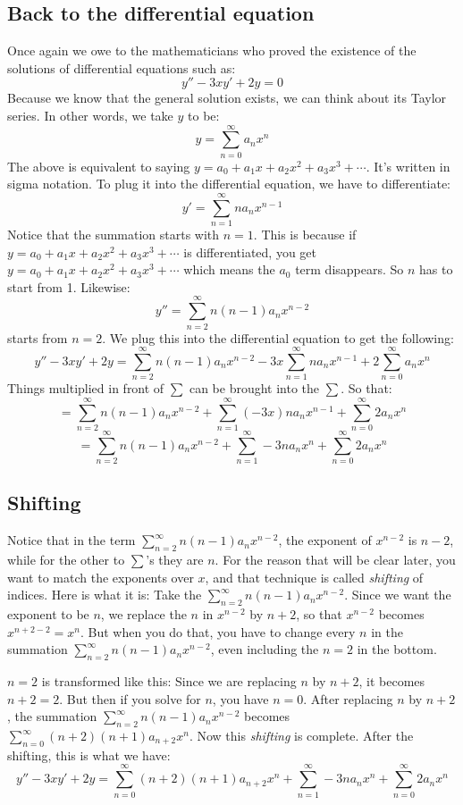 \documentclass[12pt]{report}
\begin{document}
\subsection*{Back to the differential equation}
Once again we owe to the mathematicians who proved the existence of the solutions of differential equations such as:
$$y'' - 3xy'+2y=0$$
Because we know that the general solution exists, we can think about its Taylor series. In other words, we take $y$ to be:
$$y = \sum_{n=0}^{\infty} a_n x^{n} $$
The above is equivalent to saying $y=a_0 + a_1 x + a_2 x^2 +a_3 x^3 +\cdots$. It's written in sigma notation.
To plug it into the differential equation, we have to differentiate:
$$y' = \sum_{n=1}^{\infty} n a_n x^{n-1} $$
Notice that the summation starts with $n=1$. This is because if $y=a_0 + a_1 x + a_2 x^2 +a_3 x^3 +\cdots$ is differentiated, you get $y=a_0 + a_1 x + a_2 x^2 +a_3 x^3 +\cdots$ which means the $a_0$ term disappears. So $n$ has to start from 1. Likewise:
$$y'' = \sum_{n=2}^{\infty} n (n-1) a_n x^{n-2} $$
starts from $n=2$.
We plug this into the differential equation to get the following:
$$y'' - 3xy'+2y= \sum_{n=2}^{\infty} n (n-1) a_n x^{n-2} -3x \sum_{n=1}^{\infty} n a_n x^{n-1}+2\sum_{n=0}^{\infty} a_n x^{n}$$
Things multiplied in front of $\sum$ can be brought into the $\sum$. So that:
$$= \sum_{n=2}^{\infty} n (n-1) a_n x^{n-2} + \sum_{n=1}^{\infty} (-3x)n a_n x^{n-1}+\sum_{n=0}^{\infty} 2a_n x^{n}$$
$$= \sum_{n=2}^{\infty} n (n-1) a_n x^{n-2} + \sum_{n=1}^{\infty} -3 n a_n x^{n}+\sum_{n=0}^{\infty} 2a_n x^{n}$$

\subsection*{Shifting}
Notice that in the term $\sum_{n=2}^{\infty} n (n-1) a_n x^{n-2}$, the exponent of $x^{n-2}$ is $n-2$, while for the other to $\sum$'s they are $n$. For the reason that will be clear later, you want to match the exponents over $x$, and that technique is called \textit{shifting} of indices. Here is what it is: Take the $\sum_{n=2}^{\infty} n (n-1) a_n x^{n-2}$. Since we want the exponent to be $n$, we replace the $n$ in $x^{n-2}$ by $n+2$, so that $x^{n-2}$ becomes $x^{n+2-2}=x^{n}$. But when you do that, you have to change every $n$ in the summation $\sum_{n=2}^{\infty} n (n-1) a_n x^{n-2}$, even including the $n=2$ in the bottom.


$n=2$ is transformed like this: Since we are replacing $n$ by $n+2$, it becomes $n+2=2$. But then if you solve for $n$, you have $n=0$.
After replacing $n$ by $n+2$, the summation $\sum_{n=2}^{\infty} n (n-1) a_n x^{n-2}$ becomes $\sum_{n=0}^{\infty} (n+2) (n+1) a_{n+2} x^{n}$. Now this \textit{shifting} is complete. After the shifting, this is what we have:
$$y'' - 3xy'+2y=\sum_{n=0}^{\infty} (n+2) (n+1) a_{n+2} x^{n} + \sum_{n=1}^{\infty} -3 n a_n x^{n}+\sum_{n=0}^{\infty} 2a_n x^{n}$$
\end{document}
